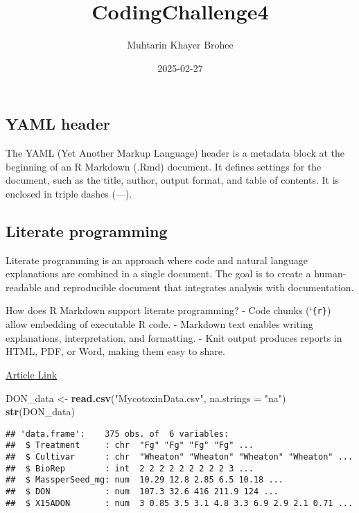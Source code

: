 \documentclass[
]{article}
\title{CodingChallenge4}
\author{Muhtarin Khayer Brohee}
\date{2025-02-27}
\newenvironment{Shaded}{\begin{snugshade}}{\end{snugshade}}
\newcommand{\AttributeTok}[1]{\textcolor[rgb]{0.13,0.29,0.53}{#1}}
\newcommand{\FunctionTok}[1]{\textcolor[rgb]{0.13,0.29,0.53}{\textbf{#1}}}
\newcommand{\NormalTok}[1]{#1}
\newcommand{\OtherTok}[1]{\textcolor[rgb]{0.56,0.35,0.01}{#1}}
\newcommand{\StringTok}[1]{\textcolor[rgb]{0.31,0.60,0.02}{#1}}
\begin{document}
\maketitle

\subsection{\texorpdfstring{\textbf{YAML
header}}{YAML header}}\label{yaml-header}

The YAML (Yet Another Markup Language) header is a metadata block at the
beginning of an R Markdown (.Rmd) document. It defines settings for the
document, such as the title, author, output format, and table of
contents. It is enclosed in triple dashes (---).

\subsection{\texorpdfstring{\textbf{Literate
programming}}{Literate programming}}\label{literate-programming}

Literate programming is an approach where code and natural language
explanations are combined in a single document. The goal is to create a
human-readable and reproducible document that integrates analysis with
documentation.

How does R Markdown support literate programming? - Code chunks
(`\texttt{\{r\}}) allow embedding of executable R code. - Markdown text
enables writing explanations, interpretation, and formatting. - Knit
output produces reports in HTML, PDF, or Word, making them easy to
share.

\href{https://pubmed.ncbi.nlm.nih.gov/34587775/}{Article Link}

\begin{Shaded}
\begin{Highlighting}[]
\NormalTok{DON\_data }\OtherTok{\textless{}{-}} \FunctionTok{read.csv}\NormalTok{(}\StringTok{"MycotoxinData.csv"}\NormalTok{, }\AttributeTok{na.strings =} \StringTok{"na"}\NormalTok{)}
\FunctionTok{str}\NormalTok{(DON\_data)}
\end{Highlighting}
\end{Shaded}

\begin{verbatim}
## 'data.frame':    375 obs. of  6 variables:
##  $ Treatment     : chr  "Fg" "Fg" "Fg" "Fg" ...
##  $ Cultivar      : chr  "Wheaton" "Wheaton" "Wheaton" "Wheaton" ...
##  $ BioRep        : int  2 2 2 2 2 2 2 2 2 3 ...
##  $ MassperSeed_mg: num  10.29 12.8 2.85 6.5 10.18 ...
##  $ DON           : num  107.3 32.6 416 211.9 124 ...
##  $ X15ADON       : num  3 0.85 3.5 3.1 4.8 3.3 6.9 2.9 2.1 0.71 ...
\end{verbatim}
\end{document}
